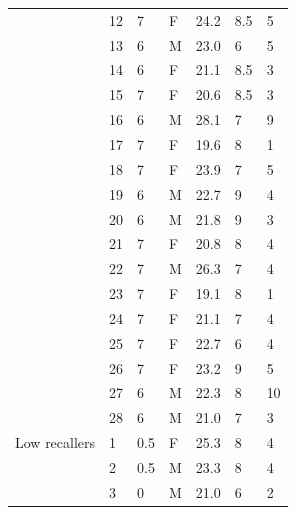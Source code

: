 \begin{longtable}{@{\extracolsep{\fill}}lllllll@{}}
	               	& 12 & 7              & F      & 24.2 			& 8.5           	& 5               \\
	               	& 13 & 6              & M      & 23.0 			& 6             	& 5               \\
	               	& 14 & 6              & F      & 21.1 			& 8.5           	& 3               \\
	               	& 15 & 7              & F      & 20.6 			& 8.5           	& 3               \\
	               	& 16 & 6              & M      & 28.1 			& 7             	& 9               \\
	               	& 17 & 7              & F      & 19.6 			& 8             	& 1               \\
	               	& 18 & 7              & F      & 23.9 			& 7             	& 5               \\
	               	& 19 & 6              & M      & 22.7 			& 9             	& 4               \\
	               	& 20 & 6              & M      & 21.8 			& 9             	& 3               \\
	               	& 21 & 7              & F      & 20.8 			& 8             	& 4               \\
	               	& 22 & 7              & M      & 26.3 			& 7             	& 4               \\
	               	& 23 & 7              & F      & 19.1 			& 8             	& 1               \\
	               	& 24 & 7              & F      & 21.1 			& 7             	& 4               \\
	               	& 25 & 7              & F      & 22.7 			& 6             	& 4               \\
	               	& 26 & 7              & F      & 23.2 			& 9             	& 5               \\
	               	& 27 & 6              & M      & 22.3 			& 8             	& 10              \\
	               	& 28 & 6              & M      & 21.0 			& 7             	& 3               \\
	Low recallers  	& 1  & 0.5            & F      & 25.3 			& 8             	& 4               \\
	               	& 2  & 0.5            & M      & 23.3 			& 8             	& 4               \\
	               	& 3  & 0              & M      & 21.0 			& 6             	& 2               \\

\end{longtable}
